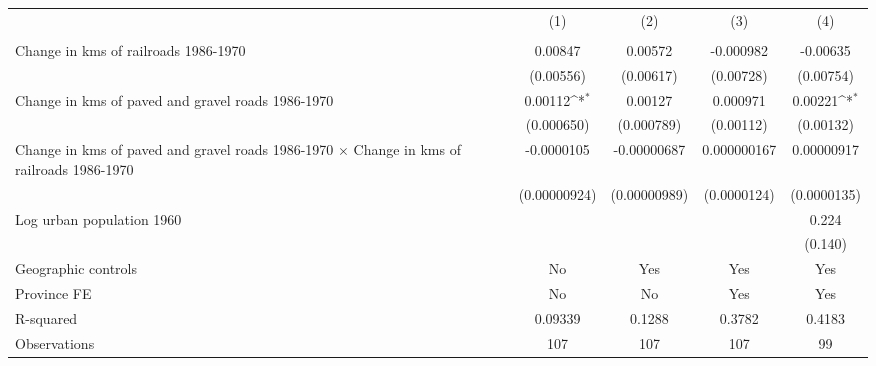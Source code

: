 {
\def\sym#1{\ifmmode^{#1}\else\(^{#1}\)\fi}
\begin{tabular}{l*{4}{c}}
\hline\hline
                &\multicolumn{1}{c}{(1)}&\multicolumn{1}{c}{(2)}&\multicolumn{1}{c}{(3)}&\multicolumn{1}{c}{(4)}\\
                &\multicolumn{1}{c}{}&\multicolumn{1}{c}{}&\multicolumn{1}{c}{}&\multicolumn{1}{c}{}\\
\hline
Change in kms of railroads 1986-1970&  0.00847         &  0.00572         &-0.000982         & -0.00635         \\
                &(0.00556)         &(0.00617)         &(0.00728)         &(0.00754)         \\
[1em]
Change in kms of paved and gravel roads 1986-1970&  0.00112\sym{*}  &  0.00127         & 0.000971         &  0.00221\sym{*}  \\
                &(0.000650)         &(0.000789)         &(0.00112)         &(0.00132)         \\
[1em]
Change in kms of paved and gravel roads 1986-1970 $\times$ Change in kms of railroads 1986-1970&-0.0000105         &-0.00000687         &0.000000167         &0.00000917         \\
                &(0.00000924)         &(0.00000989)         &(0.0000124)         &(0.0000135)         \\
[1em]
Log urban population 1960&                  &                  &                  &    0.224         \\
                &                  &                  &                  &  (0.140)         \\
\hline
Geographic controls&       No         &      Yes         &      Yes         &      Yes         \\
Province FE     &       No         &       No         &      Yes         &      Yes         \\
R-squared       &  0.09339         &   0.1288         &   0.3782         &   0.4183         \\
Observations    &      107         &      107         &      107         &       99         \\
\hline\hline
\end{tabular}
}
